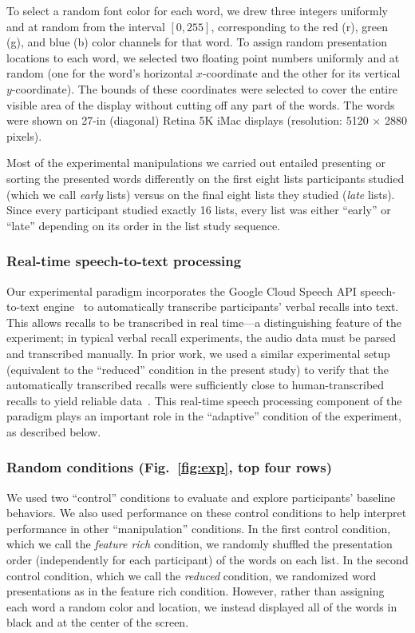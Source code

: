 \documentclass[11pt]{article}
\begin{document}
To select a random font color for each word, we drew three integers uniformly
and at random from the interval $\left[0, 255\right]$, corresponding to the red
(r), green (g), and blue (b) color channels for that word. To assign random
presentation locations to each word, we selected two floating point numbers
uniformly and at random (one for the word's horizontal $x$-coordinate and the
other for its vertical $y$-coordinate). The bounds of these coordinates were
selected to cover the entire visible area of the display without cutting off
any part of the words. The words were shown on 27-in (diagonal) Retina 5K iMac
displays (resolution: 5120 $\times$ 2880 pixels).

Most of the experimental manipulations we carried out entailed presenting or
sorting the presented words differently on the first eight lists participants
studied (which we call \textit{early} lists) versus on the final eight lists
they studied (\textit{late} lists). Since every participant studied exactly 16
lists, every list was either ``early'' or ``late'' depending on its order in
the list study sequence.


\subsubsection*{Real-time speech-to-text processing}

Our experimental paradigm incorporates the Google Cloud Speech API
speech-to-text engine~\citep{HalpEtal16} to automatically transcribe
participants' verbal recalls into text. This allows recalls to be transcribed
in real time---a distinguishing feature of the experiment; in typical verbal
recall experiments, the audio data must be parsed and transcribed manually. In
prior work, we used a similar experimental setup (equivalent to the ``reduced''
condition in the present study) to verify that the automatically transcribed
recalls were sufficiently close to human-transcribed recalls to yield reliable
data~\citep{ZimaEtal18}. This real-time speech processing component of the
paradigm plays an important role in the ``adaptive'' condition of the
experiment, as described below.

\subsubsection*{Random conditions (Fig.~\ref{fig:exp}, top four rows)}

We used two ``control'' conditions to evaluate and explore participants'
baseline behaviors. We also used performance on these control conditions to
help interpret performance in other ``manipulation'' conditions. In the first
control condition, which we call the \textit{feature rich} condition, we
randomly shuffled the presentation order (independently for each participant)
of the words on each list. In the second control condition, which we call the
\textit{reduced} condition, we randomized word presentations as in the feature
rich condition. However, rather than assigning each word a random color and
location, we instead displayed all of the words in black and at the center of
the screen.
\end{document}
